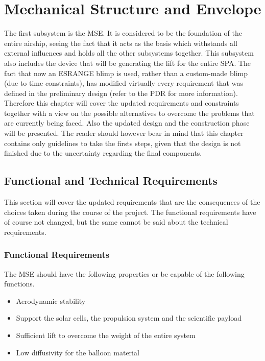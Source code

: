 \chapter{Mechanical Structure and Envelope}
\label{chap:mse}

The first subsystem is the \ac{MSE}. It is considered to be the foundation of the entire airship, seeing the fact that it acts as the basis which withstands all external influences and holds all the other subsystems together. This subsystem also includes the device that will be generating the lift for the entire \ac{SPA}. The fact that now an ESRANGE blimp is used, rather than a custom-made blimp (due to time constraints), has modified virtually every requirement that was defined in the preliminary design (refer to the \ac{PDR} for more information). Therefore this chapter will cover the updated requirements and constraints together with a view on the possible alternatives to overcome the problems that are currently being faced. Also the updated design and the construction phase will be presented. The reader should however bear in mind that this chapter contains only guidelines to take the firsts steps, given that the design is not finished due to the uncertainty regarding the final components.

\section{Functional and Technical Requirements}

This section will cover the updated requirements that are the consequences of the choices taken during the course of the project. The functional requirements have of course not changed, but the same cannot be said about the technical requirements.

\subsection{Functional Requirements}

The \ac{MSE} should have the following properties or be capable of the following functions.

\begin{itemize}
\item Aerodynamic stability
\item Support the solar cells, the propulsion system and the scientific payload
\item Sufficient lift to overcome the weight of the entire system
\item Low diffusivity for the balloon material
\end{itemize}

